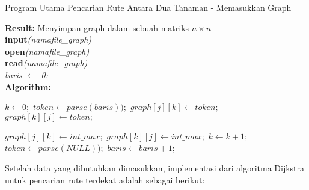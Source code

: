 \documentclass[conference]{IEEEtran}
\begin{document}
    \begin{algorithm}
        \caption{ Program Utama Pencarian Rute Antara Dua Tanaman - Memasukkan Graph} 
        \textbf{Result: } Menyimpan graph dalam sebuah matriks $n \times n$\\
        \textbf{input}\textit{(namafile\_graph)}\\
        \textbf{open}\textit{(namafile\_graph)}\\
        \textbf{read}\textit{(namafile\_graph)}\\
        \textit{baris $\leftarrow$ 0: }\\
        \textbf{Algorithm: }

        \begin{algorithmic}[1]
                \State $k \leftarrow 0;$
                \State $token \leftarrow parse(baris));$
                    \State $graph[j][k] \leftarrow token;$
                    \State $graph[k][j] \leftarrow token;$

                        \State $graph[j][k] \leftarrow int\_max;$
                        \State $graph[k][j] \leftarrow int\_max;$
                    \Else
                        \State $k \leftarrow k+1;$
                        \State $token \leftarrow parse(NULL));$
                \State $baris \leftarrow baris+1;$
        \end{algorithmic}
    \end{algorithm}

    Setelah data yang dibutuhkan dimasukkan, implementasi dari algoritma Dijkstra untuk pencarian rute terdekat adalah sebagai berikut:
\end{document}
